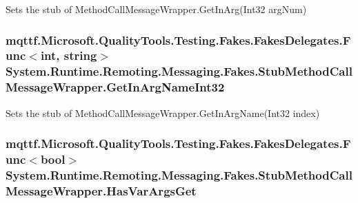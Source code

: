 Sets the stub of Method\-Call\-Message\-Wrapper.\-Get\-In\-Arg(\-Int32 arg\-Num)

\hypertarget{class_system_1_1_runtime_1_1_remoting_1_1_messaging_1_1_fakes_1_1_stub_method_call_message_wrapper_a0bb145c7bf48450125aa499d054d2968}{
\subsubsection[{Get\-In\-Arg\-Name\-Int32}]{\setlength{\rightskip}{0pt plus 5cm}mqttf.\-Microsoft.\-Quality\-Tools.\-Testing.\-Fakes.\-Fakes\-Delegates.\-Func$<$int, string$>$ System.\-Runtime.\-Remoting.\-Messaging.\-Fakes.\-Stub\-Method\-Call\-Message\-Wrapper.\-Get\-In\-Arg\-Name\-Int32}}\label{class_system_1_1_runtime_1_1_remoting_1_1_messaging_1_1_fakes_1_1_stub_method_call_message_wrapper_a0bb145c7bf48450125aa499d054d2968}


Sets the stub of Method\-Call\-Message\-Wrapper.\-Get\-In\-Arg\-Name(\-Int32 index)

\hypertarget{class_system_1_1_runtime_1_1_remoting_1_1_messaging_1_1_fakes_1_1_stub_method_call_message_wrapper_ab8bc85670517d3aa4d340658a4da1d6d}{
\subsubsection[{Has\-Var\-Args\-Get}]{\setlength{\rightskip}{0pt plus 5cm}mqttf.\-Microsoft.\-Quality\-Tools.\-Testing.\-Fakes.\-Fakes\-Delegates.\-Func$<$bool$>$ System.\-Runtime.\-Remoting.\-Messaging.\-Fakes.\-Stub\-Method\-Call\-Message\-Wrapper.\-Has\-Var\-Args\-Get}}\label{class_system_1_1_runtime_1_1_remoting_1_1_messaging_1_1_fakes_1_1_stub_method_call_message_wrapper_ab8bc85670517d3aa4d340658a4da1d6d}


